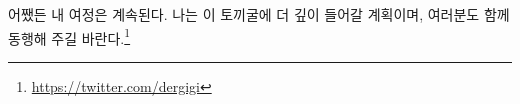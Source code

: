 \begin{comment}
	In any case, my journey continues. I plan to venture further down into the
	depths of this rabbit hole, and I invite you to tag
	along for the ride.\footnote{\url{https://twitter.com/dergigi}}
\end{comment}
어쨌든 내 여정은 계속된다. 
나는 이 토끼굴에 더 깊이 들어갈 계획이며, 여러분도 함께 동행해 주길 바란다.\footnote{\url{https://twitter.com/dergigi}}

%
